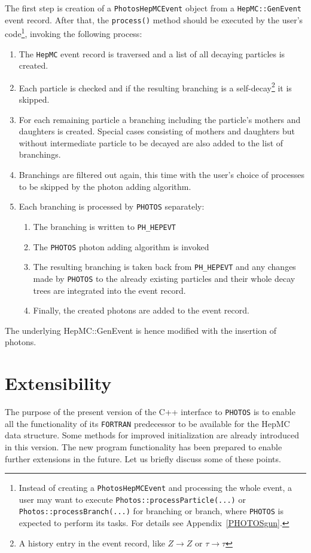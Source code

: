 \documentclass[]{Photos_interface_design}
\begin{document}
The first step is creation of a {\tt PhotosHepMCEvent} object from
a {\tt HepMC::GenEvent} event record. After that, the {\tt process()} method should
be executed by the user's code\footnote{Instead of creating a {\tt PhotosHepMCEvent} and processing the whole event,
a user may want to execute {\tt Photos::processParticle(...)} or {\tt Photos::processBranch(...)}
for branching or branch, where {\tt PHOTOS} is expected to perform its tasks.
For details see Appendix~\ref{PHOTOSgun}.
}, invoking the following process:

\begin{enumerate}
\item The {\tt HepMC} event record is traversed and a list of all decaying
      particles is created.
\item Each particle is checked and if the resulting branching is a self-decay\footnote{A history entry in the event record, like
      $Z\to Z$ or $\tau \to \tau$} it is skipped.
\item For each remaining particle a branching  including the particle's mothers and daughters
      is created. Special cases consisting of mothers and daughters but without  intermediate particle 
to be decayed are also added to the 
	  list of branchings.
\item Branchings are filtered out again, this time with  the user's choice of processes
      to be skipped by the photon adding algorithm.
\item Each branching  is processed by {\tt PHOTOS} separately:

	\begin{enumerate}
  
	\item The branching is written to {\tt PH\_HEPEVT}
	\item The {\tt PHOTOS} photon adding algorithm is invoked 
 	\item The resulting branching is taken back from {\tt PH\_HEPEVT} and any changes made by {\tt PHOTOS}
	      to the already existing particles and their whole decay trees are integrated into the event record.
	\item Finally, the created photons are added to the event record.
	\end{enumerate}

\end{enumerate}

The underlying HepMC::GenEvent is hence modified with the  insertion of photons.

\section{Extensibility}
\label{sec:extensibility}
 The purpose of the present version of the C++ interface to {\tt PHOTOS} is to enable 
all the functionality of its {\tt FORTRAN} predecessor to be available for the HepMC data
structure. Some methods for improved initialization are already introduced in this version. The new program 
functionality has been prepared to enable further extensions in the future. 
Let us briefly discuss some of these points.
\end{document}
